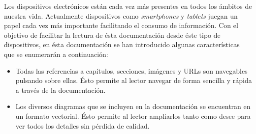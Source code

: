 Los dispositivos electrónicos están cada vez más presentes en todos los ámbitos de nuestra vida.  Actualmente dispositivos como \textit{smartphones} y \textit{tablets} juegan un papel cada vez más importante facilitando el consumo de información.  Con el objetivo de facilitar la lectura de ésta documentación desde éste tipo de dispositivos, en ésta documentación se han introducido algunas características que se enumerarán a continuación:
\begin{itemize}
	\item
		Todas las referencias a capítulos, secciones, imágenes y URLs son navegables pulsando sobre ellas.  Ésto permite al lector navegar de forma sencilla y rápida a través de la documentación.
	\item
		Los diversos diagramas que se incluyen en la documentación se encuentran en un formato vectorial.  Ésto permite al lector ampliarlos tanto como desee para ver todos los detalles sin pérdida de calidad.
\end{itemize}